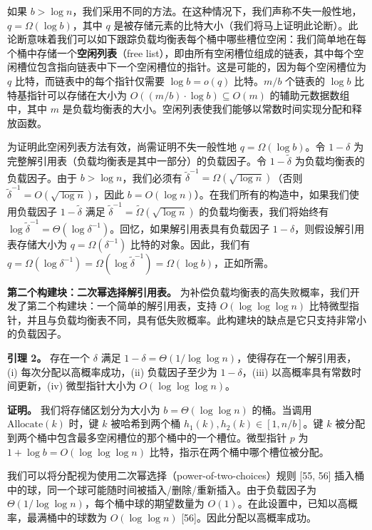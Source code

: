 \documentclass[12pt,a4paper]{ctexart}
\theoremstyle{remark}
\begin{document}
如果 $b>\log n$，我们采用不同的方法。在这种情况下，我们声称不失一般性地，$q=\Omega(\log b)$，其中 $q$ 是被存储元素的比特大小（我们将马上证明此论断）。此论断意味着我们可以如下跟踪负载均衡表每个桶中哪些槽位空闲：我们简单地在每个桶中存储一个\textbf{空闲列表}（free list），即由所有空闲槽位组成的链表，其中每个空闲槽位包含指向链表中下一个空闲槽位的指针。这是可能的，因为每个空闲槽位为 $q$ 比特，而链表中的每个指针仅需要 $\log b=o(q)$ 比特。$m/b$ 个链表的 $\log b$ 比特基指针可以存储在大小为 $O((m/b)\cdot\log b)\subseteq O(m)$ 的辅助元数据数组中，其中 $m$ 是负载均衡表的大小。空闲列表使我们能够以常数时间实现分配和释放函数。

为证明此空闲列表方法有效，尚需证明不失一般性地 $q=\Omega(\log b)$。令 $1-\delta$ 为完整解引用表（负载均衡表是其中一部分）的负载因子。令 $1-\tilde{\delta}$ 为负载均衡表的负载因子。由于 $b>\log n$，我们必须有 $\tilde{\delta}^{-1}=\Omega(\sqrt{\log n})$（否则 $\tilde{\delta}^{-1}=O(\sqrt{\log n})$，因此 $b=O(\log n)$）。在我们所有的构造中，如果我们使用负载因子 $1-\tilde{\delta}$ 满足 $\tilde{\delta}^{-1}=\tilde{\Omega}(\sqrt{\log n})$ 的负载均衡表，我们将始终有 $\log\tilde{\delta}^{-1}=\Theta(\log\delta^{-1})$。回忆，如果解引用表具有负载因子 $1-\delta$，则假设解引用表存储大小为 $q=\Omega(\delta^{-1})$ 比特的对象。因此，我们有 $q=\Omega(\log\delta^{-1})=\Omega(\log\tilde{\delta}^{-1})=\Omega(\log b)$，正如所需。

\textbf{第二个构建块：二次幂选择解引用表。} 为补偿负载均衡表的高失败概率，我们开发了第二个构建块：一个简单的解引用表，支持 $O(\log\log\log n)$ 比特微型指针，并且与负载均衡表不同，具有低失败概率。此构建块的缺点是它只支持非常小的负载因子。

\textbf{引理 2。} 存在一个 $\delta$ 满足 $1-\delta=\Theta(1/\log\log n)$，使得存在一个解引用表，(i) 每次分配以高概率成功，(ii) 负载因子至少为 $1-\delta$，(iii) 以高概率具有常数时间更新，(iv) 微型指针大小为 $O(\log\log\log n)$。

\textbf{证明。} 我们将存储区划分为大小为 $b=\Theta(\log\log n)$ 的桶。当调用 $\text{Allocate}(k)$ 时，键 $k$ 被哈希到两个桶 $h_1(k),h_2(k)\in[1,n/b]$。键 $k$ 被分配到两个桶中包含最多空闲槽位的那个桶中的一个槽位。微型指针 $p$ 为 $1+\log b=O(\log\log\log n)$ 比特，指示在两个桶中哪个槽位被分配。

我们可以将分配视为使用二次幂选择（power-of-two-choices）规则 [55, 56] 插入桶中的球，同一个球可能随时间被插入/删除/重新插入。由于负载因子为 $\Theta(1/\log\log n)$，每个桶中球的期望数量为 $O(1)$。在此设置中，已知以高概率，最满桶中的球数为 $O(\log\log n)$ [56]。因此分配以高概率成功。
\end{document}
